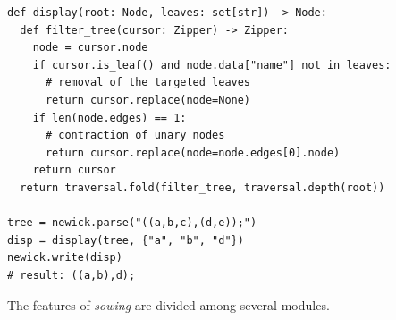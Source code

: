 \begin{listing}[h]
\begin{verbatim}
def display(root: Node, leaves: set[str]) -> Node:
  def filter_tree(cursor: Zipper) -> Zipper:
    node = cursor.node
    if cursor.is_leaf() and node.data["name"] not in leaves:
      # removal of the targeted leaves
      return cursor.replace(node=None)
    if len(node.edges) == 1:
      # contraction of unary nodes
      return cursor.replace(node=node.edges[0].node)
    return cursor
  return traversal.fold(filter_tree, traversal.depth(root))

tree = newick.parse("((a,b,c),(d,e));")
disp = display(tree, {"a", "b", "d"})
newick.write(disp)
# result: ((a,b),d);
\end{verbatim}
    \caption[Using the \emph{sowing} library to modify a tree]{
        Function that contracts a tree to keep a given set of leaves.
        Despite the immutable nature of the data structure, this function uses \(\bigo(n)\) time and space, where \(n\) is the number of nodes in the initial tree.
        \label{lst:logiciel:sowing-ex}
    }
\end{listing}

The features of \emph{sowing} are divided among several modules.

